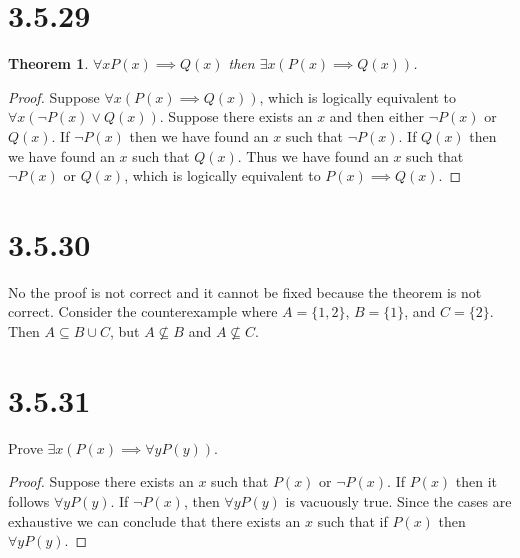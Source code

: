 \documentclass{article}
\newtheorem*{theorem}{Theorem}  %
\begin{document}
\section*{3.5.29}
\begin{theorem} $\forall x P(x) \implies Q(x)$ then $\exists x (P(x) \implies Q(x))$.
\end{theorem}

\begin{proof}
Suppose $\forall x (P(x) \implies Q(x))$, which is logically equivalent to $\forall x (\lnot P(x) \lor Q(x))$. Suppose there exists an $x$ and then either $\lnot P(x)$ or $Q(x)$. If $\lnot P(x)$ then we have found an $x$ such that $\lnot P(x)$. If $Q(x)$ then we have found an $x$ such that $Q(x)$. Thus we have found an $x$ such that $\lnot P(x)$ or $Q(x)$, which is logically equivalent to $P(x) \implies Q(x)$.
\end{proof}

\section*{3.5.30}
No the proof is not correct and it cannot be fixed because the theorem is not correct. Consider the counterexample where $A = \{1,2\}$, $B = \{1\}$, and $C = \{2\}$. Then $A \subseteq B \cup C$, but $A \not\subseteq B$ and $A \not\subseteq C$.

\section*{3.5.31}
Prove $\exists x (P(x) \implies \forall y P(y))$.

\begin{proof}
Suppose there exists an $x$ such that $P(x)$ or $\neg P(x)$. If $P(x)$ then it follows $\forall y P(y)$. If $\neg P(x)$, then $\forall y P(y)$ is vacuously true. Since the cases are exhaustive we can conclude that there exists an $x$ such that if $P(x)$ then $\forall y P(y)$.
\end{proof}
\end{document}
